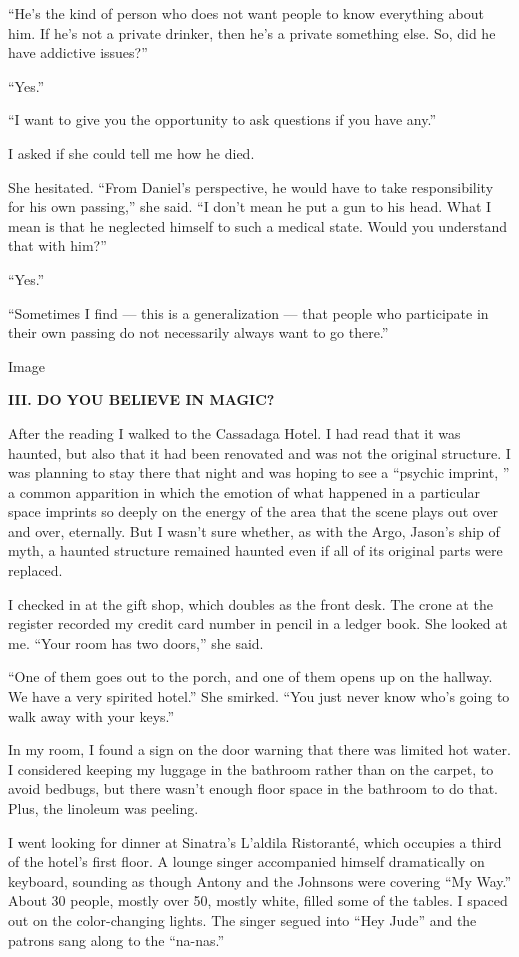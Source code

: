 ``He's the kind of person who does not want people to know everything
about him. If he's not a private drinker, then he's a private something
else. So, did he have addictive issues?''

``Yes.''

``I want to give you the opportunity to ask questions if you have any.''

I asked if she could tell me how he died.

She hesitated. ``From Daniel's perspective, he would have to take
responsibility for his own passing,'' she said. ``I don't mean he put a
gun to his head. What I mean is that he neglected himself to such a
medical state. Would you understand that with him?''

``Yes.''

``Sometimes I find --- this is a generalization --- that people who
participate in their own passing do not necessarily always want to go
there.''

Image

\textbf{III. DO YOU BELIEVE IN MAGIC?}

After the reading I walked to the Cassadaga Hotel. I had read that it
was haunted, but also that it had been renovated and was not the
original structure. I was planning to stay there that night and was
hoping to see a ``psychic imprint, '' a common apparition in which the
emotion of what happened in a particular space imprints so deeply on the
energy of the area that the scene plays out over and over, eternally.
But I wasn't sure whether, as with the Argo, Jason's ship of myth, a
haunted structure remained haunted even if all of its original parts
were replaced.

I checked in at the gift shop, which doubles as the front desk. The
crone at the register recorded my credit card number in pencil in a
ledger book. She looked at me. ``Your room has two doors,'' she said.

``One of them goes out to the porch, and one of them opens up on the
hallway. We have a very spirited hotel.'' She smirked. ``You just never
know who's going to walk away with your keys.''

In my room, I found a sign on the door warning that there was limited
hot water. I considered keeping my luggage in the bathroom rather than
on the carpet, to avoid bedbugs, but there wasn't enough floor space in
the bathroom to do that. Plus, the linoleum was peeling.

I went looking for dinner at Sinatra's L'aldila Ristoranté, which
occupies a third of the hotel's first floor. A lounge singer accompanied
himself dramatically on keyboard, sounding as though Antony and the
Johnsons were covering ``My Way.'' About 30 people, mostly over 50,
mostly white, filled some of the tables. I spaced out on the
color-changing lights. The singer segued into ``Hey Jude'' and the
patrons sang along to the ``na-nas.''

